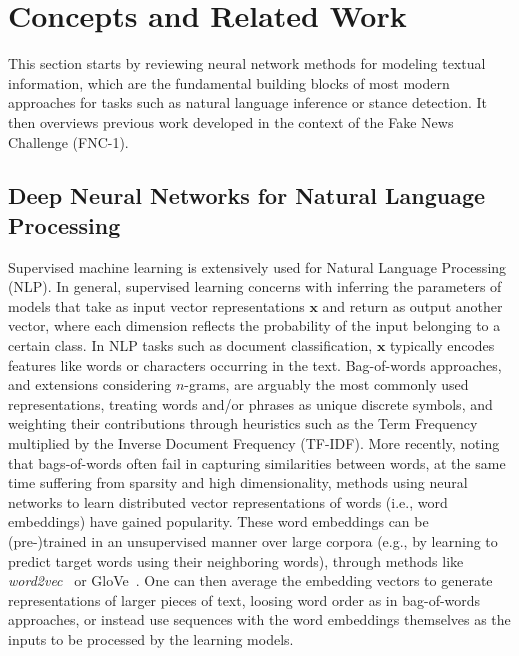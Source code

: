 \section{Concepts and Related Work}

This section starts by reviewing neural network methods for modeling textual information, which are the fundamental building blocks of most modern approaches for tasks such as natural language inference or stance detection. It then overviews previous work developed in the context of the Fake News Challenge (FNC-1).

\subsection{Deep Neural Networks for Natural Language Processing}

Supervised machine learning is extensively used for Natural Language Processing (NLP). In general, supervised learning concerns with inferring the parameters of models that take as input vector representations $\boldsymbol{x}$ and return as output another vector, where each dimension reflects the probability of the input belonging to a certain class. In NLP tasks such as document classification, $\boldsymbol{x}$ typically encodes features like words or characters occurring in the text. Bag-of-words approaches, and extensions considering $n$-grams, are arguably the most commonly used representations, treating words and/or phrases as unique discrete symbols, and weighting their contributions through heuristics such as the Term Frequency multiplied by the Inverse Document Frequency (TF-IDF). More recently, noting that bags-of-words often fail in capturing similarities between words, at the same time suffering from sparsity and high dimensionality, methods using neural networks to learn distributed vector representations of words (i.e., word embeddings) have gained popularity. These word embeddings can be (pre-)trained in an unsupervised manner over large corpora (e.g., by learning to predict target words using their neighboring words), through methods like \textit{word2vec}~\cite{word2vec} or GloVe~\cite{glove}. One can then average the embedding vectors to generate representations of larger pieces of text, loosing word order as in bag-of-words approaches, or instead use sequences with the word embeddings themselves as the inputs to be processed by the learning models.

